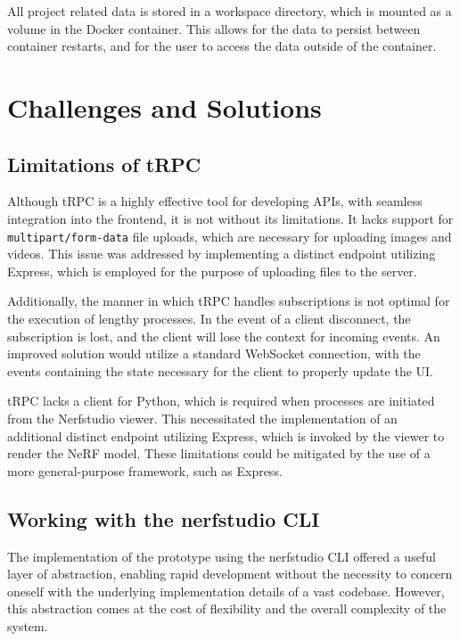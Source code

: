 All project related data is stored in a workspace directory, which is mounted as a volume in the Docker container.
This allows for the data to persist between container restarts, and for the user to access the data outside of the container.

\section{Challenges and Solutions}
\label{sec:system:challenges}

\subsection*{Limitations of tRPC}

Although tRPC is a highly effective tool for developing APIs, with seamless integration into the frontend, it is not without its limitations.
It lacks support for \texttt{multipart/form-data} file uploads, which are necessary for uploading images and videos.
This issue was addressed by implementing a distinct endpoint utilizing Express, which is employed for the purpose of uploading files to the server.

Additionally, the manner in which tRPC handles subscriptions is not optimal for the execution of lengthy processes.
In the event of a client disconnect, the subscription is lost, and the client will lose the context for incoming events.
An improved solution would utilize a standard WebSocket connection, with the events containing the state necessary for the client to properly update the UI.

tRPC lacks a client for Python, which is required when processes are initiated from the Nerfstudio viewer.
This necessitated the implementation of an additional distinct endpoint utilizing Express, which is invoked by the viewer to render the NeRF model.
These limitations could be mitigated by the use of a more general-purpose framework, such as Express.

\subsection*{Working with the nerfstudio CLI}

The implementation of the prototype using the nerfstudio CLI offered a useful layer of abstraction, enabling rapid development without the necessity to concern oneself with the underlying implementation details of a vast codebase.
However, this abstraction comes at the cost of flexibility and the overall complexity of the system.

